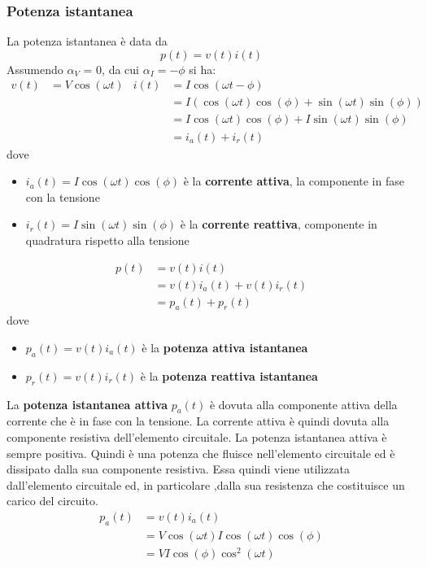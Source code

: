 \documentclass{article}
\begin{document}
\subsubsection{Potenza istantanea}
La potenza istantanea è data da 
\[
    p(t) = v(t)i(t)    
\]
Assumendo $\alpha_V$ = 0, da cui $\alpha_I=- \phi$ si ha:
\begin{align*}
    v(t) &= V \cos(\omega t) & 
    i(t) &= I \cos(\omega t - \phi)
    \\
    & &
    &=I (\cos(\omega t)\cos(\phi) + \sin(\omega t)\sin(\phi))
    \\
    & &
    &= I\cos(\omega t)\cos(\phi) + I\sin(\omega t)
    \sin(\phi)
    \\
    & &
    &= i_a(t) + i_r(t)
\end{align*}
dove 
\begin{itemize}
    \item $i_a(t)= I\cos(\omega t)\cos(\phi)$ è la \textbf{corrente attiva}, la componente in fase con la tensione
    \item $i_r(t)=I\sin(\omega t) \sin(\phi)$ è la \textbf{corrente reattiva}, componente in quadratura rispetto alla tensione
\end{itemize}
\begin{align*}
    p(t) &= v(t)i(t)
    \\
    &=v(t)i_a(t) + v(t)i_r(t)
    \\
    &=p_a(t) + p_r(t)
\end{align*}
dove
\begin{itemize}
    \item $p_a(t)= v(t)i_a(t)$ è la \textbf{potenza attiva istantanea}
    \item $p_r(t)= v(t)i_r(t)$ è la \textbf{potenza reattiva istantanea}
\end{itemize}
\vspace*{0.2cm}
La \textbf{potenza istantanea attiva} $p_a(t)$ è dovuta
alla componente attiva della corrente che è in
fase con la tensione. La corrente attiva è
quindi dovuta alla componente resistiva
dell'elemento circuitale. La potenza
istantanea attiva è sempre positiva. Quindi è
una potenza che fluisce nell'elemento
circuitale ed è dissipato dalla sua componente
resistiva. Essa quindi viene utilizzata
dall'elemento circuitale ed, in particolare ,dalla
sua resistenza che costituisce un carico del
circuito.
\begin{align*}
    p_a(t) &= v(t)i_a(t)
    \\
    &=V \cos(\omega t)I \cos(\omega t)\cos(\phi)
    \\
    &= VI\cos(\phi)\cos^2(\omega t)
\end{align*}
\end{document}
